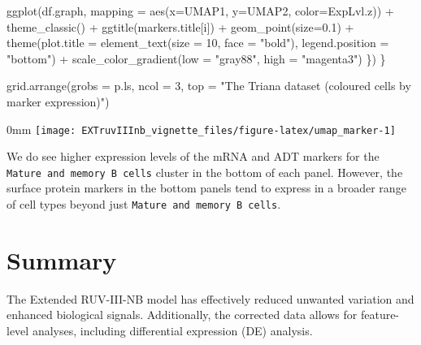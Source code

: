 \documentclass[]{article}
\newcommand{\hlnum}[1]{\textcolor[rgb]{0.816,0.125,0.439}{#1}}%
\newcommand{\hlstr}[1]{\textcolor[rgb]{0.251,0.627,0.251}{#1}}%
\newcommand{\hlstd}[1]{\textcolor[rgb]{0.251,0.251,0.251}{#1}}%
\newenvironment{Shaded}{\begin{myshaded}}{\end{myshaded}}
\newcommand{\DecValTok}[1]{\hlnum{#1}}
\newcommand{\FloatTok}[1]{\hlnum{#1}}
\newcommand{\SpecialCharTok}[1]{\hlstr{#1}}
\newcommand{\StringTok}[1]{\hlstr{#1}}
\newcommand{\FunctionTok}[1]{\hlstd{#1}}
\newcommand{\AttributeTok}[1]{{#1}}
\newcommand{\NormalTok}[1]{\hlstd{#1}}
\begin{document}
\begin{Shaded}
\begin{Highlighting}[]
    \FunctionTok{ggplot}\NormalTok{(df.graph, }\AttributeTok{mapping =} \FunctionTok{aes}\NormalTok{(}\AttributeTok{x=}\NormalTok{UMAP1, }\AttributeTok{y=}\NormalTok{UMAP2, }\AttributeTok{color=}\NormalTok{ExpLvl.z)) }\SpecialCharTok{+}
    \FunctionTok{theme\_classic}\NormalTok{() }\SpecialCharTok{+}
    \FunctionTok{ggtitle}\NormalTok{(markers.title[i]) }\SpecialCharTok{+}
    \FunctionTok{geom\_point}\NormalTok{(}\AttributeTok{size=}\FloatTok{0.1}\NormalTok{) }\SpecialCharTok{+}
    \FunctionTok{theme}\NormalTok{(}\AttributeTok{plot.title =} \FunctionTok{element\_text}\NormalTok{(}\AttributeTok{size =} \DecValTok{10}\NormalTok{, }\AttributeTok{face =} \StringTok{"bold"}\NormalTok{), }\AttributeTok{legend.position =} \StringTok{"bottom"}\NormalTok{) }\SpecialCharTok{+}
    \FunctionTok{scale\_color\_gradient}\NormalTok{(}\AttributeTok{low =} \StringTok{"gray88"}\NormalTok{, }\AttributeTok{high =} \StringTok{"magenta3"}\NormalTok{)}
\NormalTok{  \})    }
\NormalTok{\}}

\FunctionTok{grid.arrange}\NormalTok{(}\AttributeTok{grobs =}\NormalTok{ p.ls, }\AttributeTok{ncol =} \DecValTok{3}\NormalTok{,}
             \AttributeTok{top =} \StringTok{"The Triana dataset (coloured cells by marker expression)"}\NormalTok{)}
\end{Highlighting}
\end{Shaded}

\begin{adjustwidth}{\fltoffset}{0mm}
\texttt{[image: EXTruvIIInb\_vignette\_files/figure-latex/umap\_marker-1]} \end{adjustwidth}

We do see higher expression levels of the mRNA and ADT markers for the \texttt{Mature and memory B cells} cluster in the bottom of each panel. However, the surface protein markers in the bottom panels tend to express in a broader range of cell types beyond just \texttt{Mature and memory B cells}.

\section{Summary}\label{summary}

The Extended RUV-III-NB model has effectively reduced unwanted variation and enhanced biological signals. Additionally, the corrected data allows for feature-level analyses, including differential expression (DE) analysis.
\end{document}
